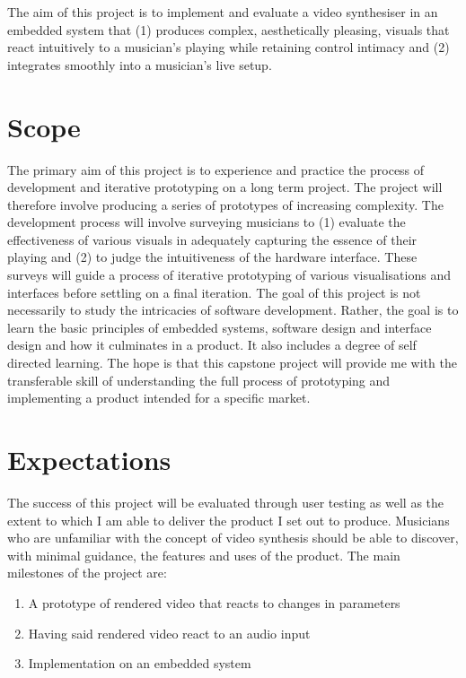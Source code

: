 \documentclass{article}
\begin{document}
The aim of this project is to implement and evaluate a video synthesiser in an embedded system that (1) produces complex, aesthetically pleasing, visuals that react intuitively to a musician's playing while retaining control intimacy and (2) integrates smoothly into a musician's live setup.

\section{Scope}
The primary aim of this project is to experience and practice the process of development and iterative prototyping on a long term project. The project will therefore involve producing a series of prototypes of increasing complexity. The development process will involve surveying musicians to (1) evaluate the effectiveness of various visuals in adequately capturing the essence of their playing and (2) to judge the intuitiveness of the hardware interface. These surveys will guide a process of iterative prototyping of various visualisations and interfaces before settling on a final iteration. The goal of this project is not necessarily to study the intricacies of software development. Rather, the goal is to learn the basic principles of embedded systems, software design and interface design and how it culminates in a product. It also includes a degree of self directed learning. The hope is that this capstone project will provide me with the transferable skill of understanding the full process of prototyping and implementing a product intended for a specific market.

\section{Expectations}
The success of this project will be evaluated through user testing as well as the extent to which I am able to deliver the product I set out to produce. Musicians who are unfamiliar with the concept of video synthesis should be able to discover, with minimal guidance, the features and uses of the product. The main milestones of the project are:
\begin{enumerate}
	\item A prototype of rendered video that reacts to changes in parameters
	\item Having said rendered video react to an audio input
	\item Implementation on an embedded system
\end{enumerate}
\end{document}
